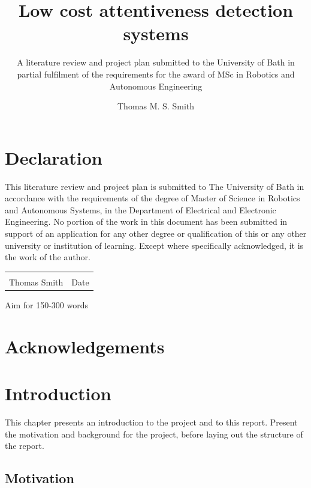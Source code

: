 \documentclass[11pt, parskip=half*,twoside=false]{scrbook}
\title{Low cost attentiveness detection systems}
\author{Thomas M. S. Smith}
\subtitle{A literature review and project plan submitted to the University of Bath in partial fulfilment of the requirements for the award of MSc in Robotics and Autonomous Engineering}
\begin{document}
\maketitle

\frontmatter

\chapter*{Declaration}

This literature review and project plan is submitted to The University of Bath in accordance with the requirements of the degree of Master of Science in Robotics and Autonomous Systems, in the Department of Electrical and Electronic Engineering. No portion of the work in this document has been submitted in support of an application for any other degree or qualification of this or any other university or institution of learning. Except where specifically acknowledged, it is the work of the author.

\vskip 2cm
\noindent\begin{tabular}{@{}p{}p{}@{}}
	\dotfill                         & \dotfill\\
	Thomas Smith              & Date\\
\end{tabular} 


Aim for 150-300 words


\tableofcontents

\printnoidxglossary[sort=letter, title={List of Abbreviations}]

\chapter*{Acknowledgements}


\mainmatter


\chapter{Introduction} \label{ch:intro}
This chapter presents an introduction to the project and to this report. Present the motivation and background for the project, before laying out the structure of the report.

\section{Motivation} \label{sec:motive}
\end{document}

